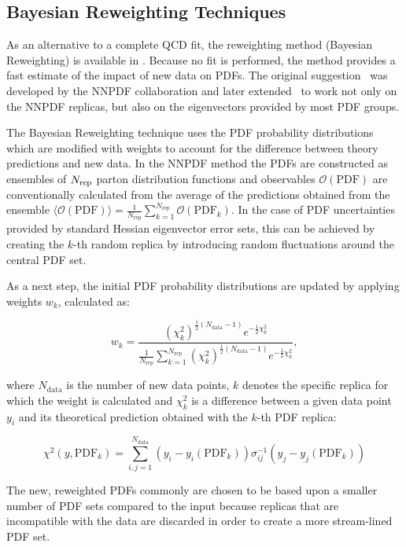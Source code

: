 \subsection{Bayesian Reweighting Techniques}

As an alternative to a complete QCD fit, the reweighting method (Bayesian Reweighting) is available in \fitter.
Because no fit is performed, the method provides a fast estimate of the impact of new data on PDFs. 
The original suggestion~\cite{Giele:1998gw} was developed by the NNPDF 
collaboration \cite{Ball:2011gg,Ball:2010gb} and later extended~\cite{Watt:2012tq}
to work not only on the NNPDF replicas, but also on the eigenvectors provided by most PDF groups. 

The Bayesian Reweighting technique uses the PDF probability distributions which are modified with weights 
to account for the difference between theory predictions and new data.
In the NNPDF method the PDFs are constructed as ensembles of $N_{\rm rep}$ parton 
distribution functions and observables $\mathcal{O}(\mathrm{PDF})$ are conventionally calculated from the average
of the predictions obtained from the ensemble 
$\langle\mathcal{O}(\mathrm{PDF})\rangle =  \frac{1}{N_{\mathrm{rep}}} \sum_{k=1}^{N_{\mathrm{rep}}} \mathcal{O}(\mathrm{PDF}_k)$.
In the case of PDF uncertainties provided by standard Hessian eigenvector error sets, this can be achieved 
by creating the $k$-th random replica by introducing random fluctuations around the central PDF set.

As a next step, the initial PDF probability distributions are updated by applying weights 
$w_k$, calculated as:

\begin{equation}
 w_k = \frac{(\chi^2_k)^{\frac{1}{2} (N_{\mathrm{data}}-1) } e^{-\frac{1}{2}\chi^2_k}}{ \frac{1}{N_{\mathrm{rep}}} \sum^{N_{\mathrm{rep}}}_{k=1}(\chi^2_k)^{\frac{1}{2}(N_{\mathrm{data}}-1)} e^{-\frac{1}{2}\chi^2_k}  },
\end{equation}

where $N_{\mathrm{data}}$ is the number of new data points, $k$ denotes the specific replica for which the weight is calculated 
and $\chi^2_k$ is a difference between a given data point $y_i$ and its theoretical prediction obtained with the $k$-th PDF replica:

{\small
\begin{equation}
 \chi^2 (y,\mathrm{PDF}_k) = \sum_{i,j=1}^{N_{\mathrm{data}}} (y_i - y_i(\mathrm{PDF}_k)) \sigma^{-1}_{ij} (y_j-y_j(\mathrm{PDF}_k))  
\end{equation}
}

The new, reweighted PDFs commonly are chosen to be based upon a smaller number of PDF sets compared to the input because replicas 
that are incompatible with the data are discarded in order to create a more stream-lined PDF set.








